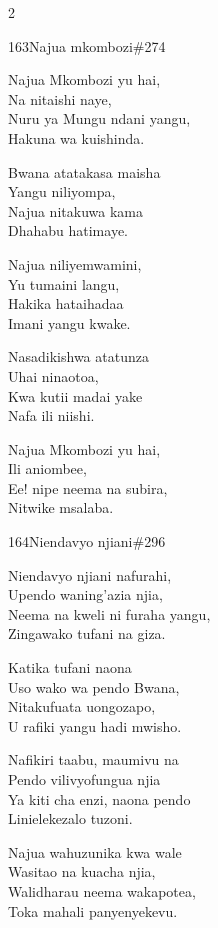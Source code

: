 \documentclass{article}
\begin{document}
\begin{multicols}{2}
\begin{hymn}{163}{Najua mkombozi}{\#274}
\begin{stanza}
Najua Mkombozi yu hai,\\
Na nitaishi naye,\\
Nuru ya Mungu ndani yangu,\\
Hakuna wa kuishinda.
\end{stanza}
\begin{chorus}
Bwana atatakasa maisha\\
Yangu niliyompa,\\
Najua nitakuwa kama\\
Dhahabu hatimaye.
\end{chorus}
\begin{stanza}
Najua niliyemwamini,\\
Yu tumaini langu,\\
Hakika hataihadaa\\
Imani yangu kwake.
\end{stanza}
\begin{stanza}
Nasadikishwa atatunza\\
Uhai ninaotoa,\\
Kwa kutii madai yake\\
Nafa ili niishi.
\end{stanza}
\begin{stanza}
Najua Mkombozi yu hai,\\
Ili aniombee,\\
Ee! nipe neema na subira,\\
Nitwike msalaba.
\end{stanza}
\end{hymn}

\begin{hymn}{164}{Niendavyo njiani}{\#296}
\begin{stanza}
Niendavyo njiani nafurahi,\\
Upendo waning'azia njia,\\
Neema na kweli ni furaha yangu,\\
Zingawako tufani na giza.
\end{stanza}
\begin{chorus}
Katika tufani naona\\
Uso wako wa pendo Bwana,\\
Nitakufuata uongozapo,\\
U rafiki yangu hadi mwisho.
\end{chorus}
\begin{stanza}
Nafikiri taabu, maumivu na\\
Pendo vilivyofungua njia\\
Ya kiti cha enzi, naona pendo\\
Linielekezalo tuzoni.
\end{stanza}
\begin{stanza}
Najua wahuzunika kwa wale\\
Wasitao na kuacha njia,\\
Walidharau neema wakapotea,\\
Toka mahali panyenyekevu.
\end{stanza}
\end{hymn}


\end{multicols}
\end{document}

